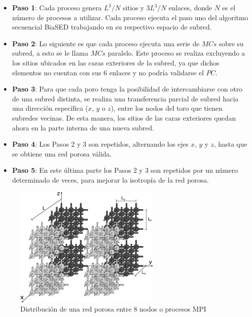 \begin{itemize}
\item[] \textbf{Paso 1}: Cada proceso genera $L^3/N$ sitios y $3L^3/N$ enlaces, donde $N$ es el número de procesos a utilizar. 
Cada proceso ejecuta el paso uno del algoritmo secuencial BiaSED trabajando en su respectivo espacio de subred.

\item[] \textbf{Paso 2}: Lo siguiente es que cada proceso ejecuta una serie de $MCs$ sobre su subred, a esto se le llama $MCs$ paralelo.
Este proceso se realiza excluyendo a los sitios ubicados en las caras exteriores de la subred, ya que dichos elementos no cuentan
con sus 6 enlaces y no podría validarse el $PC$.

\item[] \textbf{Paso 3}: Para que cada poro tenga la posibilidad de intercambiarse con otro de una subred distinta, se realiza una 
transferencia parcial de subred hacia una direcci\'on espec\'ifica ($x$, $y$ o $z$), entre los nodos del toro que tienen subredes vecinas. 
De esta manera, los sitios de las caras exteriores quedan ahora en la parte interna de una nueva subred. 

\item[] \textbf{Paso 4}: Los Pasos 2 y 3 son repetidos, alternando los ejes $x$, $y$ y $z$, hasta que se obtiene una red porosa válida.
\item[] \textbf{Paso 5}: En este última parte los Pasos 2 y 3 son repetidos por un n\'umero determinado de veces, para mejorar la isotrop\'ia
de la red porosa.
\end{itemize}

\begin{figure}[hbtp]
\centering
\includegraphics[width=2.8in]{img/distribucion}
\caption{Distribución de una red porosa entre 8 nodos o procesos MPI}
\label{fig:distribucion_rw}
\end{figure}


